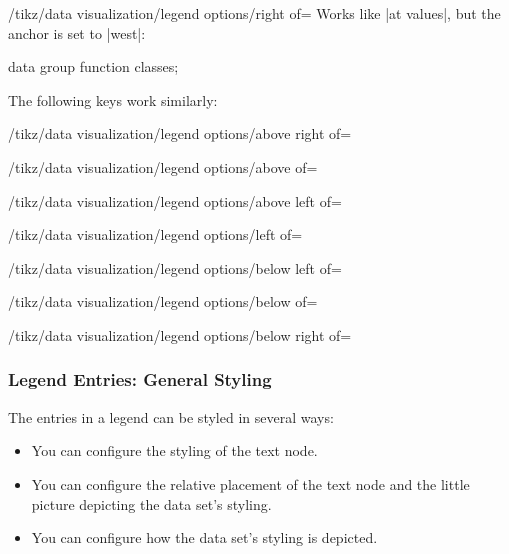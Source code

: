 \begin{key}{/tikz/data visualization/legend options/right
    of=} 
  Works like |at values|, but the anchor is set to |west|:
\begin{codeexample}[width=6cm]
\tikz \datavisualization [
  scientific axes, 
  visualize as smooth line/.list={log, lin},
  legend={right of={x=-1, y=2}},
  log=    {label in legend={text=$\log x$}},
  lin=    {label in legend={text=$x/2$}},
  style sheet=strong colors]
data group {function classes};
\end{codeexample}    
\end{key}

The following keys work similarly:
\begin{key}{/tikz/data visualization/legend options/above right of=}   
\end{key}
\begin{key}{/tikz/data visualization/legend options/above of=} 
\end{key}
\begin{key}{/tikz/data visualization/legend options/above left of=} 
\end{key}
\begin{key}{/tikz/data visualization/legend options/left of=} 
\end{key}
\begin{key}{/tikz/data visualization/legend options/below left of=} 
\end{key}
\begin{key}{/tikz/data visualization/legend options/below of=} 
\end{key}
\begin{key}{/tikz/data visualization/legend options/below right of=} 
\end{key}




\subsubsection{Legend Entries: General Styling}

\label{section-dv-label-legend-entry-options}

The entries in a legend can be styled in several ways:

\begin{itemize}
\item
  You can configure the styling of the text node.
\item
  You can configure the relative placement of the text node and the
  little picture depicting the data set's styling.
\item
  You can configure how the data set's styling is depicted.
\end{itemize}

